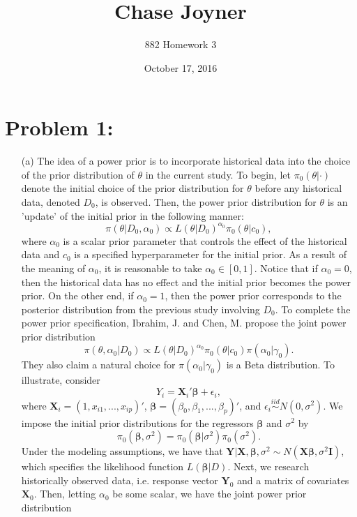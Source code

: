 \documentclass[11pt]{article}
\title{Chase Joyner}
\author{882 Homework 3}
\date{October 17, 2016}
\begin{document}
\maketitle

\section*{Problem 1:}
\begin{itemize}
\item[(a)] The idea of a power prior is to incorporate historical data into the choice of the prior distribution of $\theta$ in the current study.  To begin, let $\pi_0(\theta|\cdot)$ denote the initial choice of the prior distribution for $\theta$ before any historical data, denoted $D_0$, is observed.  Then, the power prior distribution for $\theta$ is an 'update' of the initial prior in the following manner:
\[
\pi(\theta|D_0,\alpha_0) \propto L(\theta|D_0)^{\alpha_0}\pi_0(\theta|c_0),
\]
where $\alpha_0$ is a scalar prior parameter that controls the effect of the historical data and $c_0$ is a specified hyperparameter for the initial prior.  As a result of the meaning of $\alpha_0$, it is reasonable to take $\alpha_0\in [0,1]$.  Notice that if $\alpha_0 = 0$, then the historical data has no effect and the initial prior becomes the power prior.  On the other end, if $\alpha_0 = 1$, then the power prior corresponds to the posterior distribution from the previous study involving $D_0$.  To complete the power prior specification, Ibrahim, J. and Chen, M. propose the joint power prior distribution
\[
\pi(\theta,\alpha_0|D_0) \propto L(\theta|D_0)^{\alpha_0}\pi_0(\theta|c_0)\pi(\alpha_0|\gamma_0).
\]
They also claim a natural choice for $\pi(\alpha_0|\gamma_0)$ is a Beta distribution.  To illustrate, consider
\[
Y_i = \mathbf{X}_i'\boldsymbol\beta + \epsilon_i,
\]
where $\mathbf{X}_i = (1,x_{i1},...,x_{ip})'$, $\boldsymbol\beta = (\beta_0,\beta_1,...,\beta_p)'$, and $\epsilon_i \overset{iid}{\sim}N(0,\sigma^2)$.  We impose the initial prior distributions for the regressors $\boldsymbol\beta$ and $\sigma^2$ by
\[
\pi_0(\boldsymbol\beta,\sigma^2) = \pi_0(\boldsymbol\beta|\sigma^2)\pi_0(\sigma^2).
\]
Under the modeling assumptions, we have that $\mathbf{Y} | \mathbf{X}, \boldsymbol\beta, \sigma^2 \sim N(\mathbf{X}\boldsymbol\beta,\sigma^2\mathbf{I})$, which specifies the likelihood function $L(\boldsymbol\beta|D)$.  Next, we research historically observed data, i.e. response vector $\mathbf{Y}_0$ and a matrix of covariates $\mathbf{X}_0$.  Then, letting $\alpha_0$ be some scalar, we have the joint power prior distribution

\end{itemize}
\end{document}
